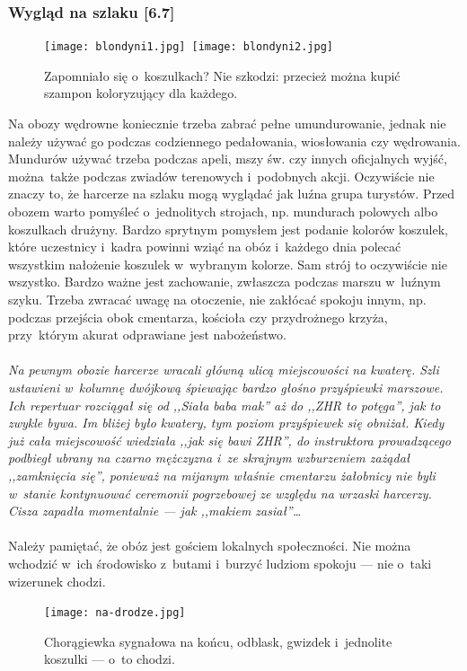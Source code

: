 \documentclass[a5paper,10pt,titlepage,twoside]{article}
\begin{document}
\subsubsection{Wygląd na szlaku [6.7]}
\begin{figure}[htp]
\centering
\texttt{[image: blondyni1.jpg]}~\texttt{[image: blondyni2.jpg]}
\caption{Zapomniało się o~koszulkach? Nie szkodzi: przecież można kupić szampon koloryzujący dla każdego.}\label{fig:blondyni}
\end{figure}
Na obozy wędrowne koniecznie trzeba zabrać pełne umundurowanie, jednak nie należy używać go podczas codziennego pedałowania, wiosłowania czy wędrowania. Mundurów używać trzeba podczas apeli, mszy św. czy innych oficjalnych wyjść, można~także podczas zwiadów terenowych i~podobnych akcji. Oczywiście nie znaczy to, że harcerze na szlaku mogą wyglądać jak luźna grupa turystów. Przed obozem warto pomyśleć o~jednolitych strojach, np. mundurach polowych albo koszulkach drużyny. Bardzo sprytnym pomysłem jest podanie kolorów koszulek, które uczestnicy i~kadra powinni wziąć na obóz i~każdego dnia polecać wszystkim nałożenie koszulek w~wybranym kolorze. Sam strój to oczywiście nie wszystko. Bardzo ważne jest zachowanie, zwłaszcza podczas marszu w~luźnym szyku. Trzeba zwracać uwagę na otoczenie, nie zakłócać spokoju innym, np. podczas przejścia obok cmentarza, kościoła czy przydrożnego krzyża, przy~którym akurat odprawiane jest nabożeństwo.
\\
\\
\small{
\emph{Na pewnym obozie harcerze wracali główną ulicą miejscowości na kwaterę. Szli ustawieni w~kolumnę dwójkową śpiewając bardzo głośno przyśpiewki marszowe. Ich repertuar rozciągał się od ,,Siała baba mak'' aż do ,,ZHR to potęga'', jak to zwykle bywa. Im bliżej było kwatery, tym poziom przyśpiewek się obniżał. Kiedy już cała miejscowość wiedziała ,,jak się bawi ZHR'', do instruktora prowadzącego podbiegł ubrany na czarno mężczyzna i~ze skrajnym wzburzeniem zażądał ,,zamknięcia się'', ponieważ na mijanym właśnie cmentarzu żałobnicy nie byli w~stanie kontynuować ceremonii pogrzebowej ze względu na wrzaski harcerzy. Cisza zapadła momentalnie --- jak ,,makiem zasiał''\ldots}}
\\
\\
Należy pamiętać, że obóz jest gościem lokalnych społeczności. Nie można wchodzić w~ich środowisko z~butami i~burzyć ludziom spokoju --- nie o~taki wizerunek chodzi.
\begin{figure}[htp]
\centering
\texttt{[image: na-drodze.jpg]}
\caption{Chorągiewka sygnałowa na końcu, odblask, gwizdek i~jednolite koszulki --- o~to chodzi.}\label{fig:na-drodze}
\end{figure}
\end{document}
